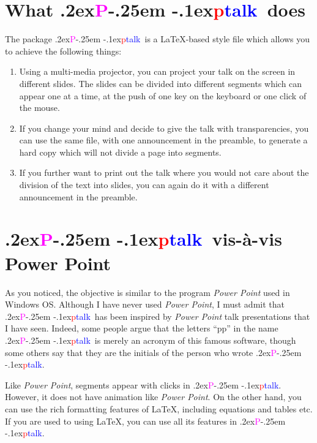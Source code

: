 \documentclass[12pt]{article}
\def\pptalk{{
\raise.2ex\hbox{\textcolor{magenta}P}\kern-.25em
\raise-.1ex\hbox{\textcolor{red}p}\textcolor{blue}{talk}}}
\begin{document}
\section{What \pptalk\ does}
The package \pptalk\ is a \LaTeX-based style file which allows you to
achieve the following things:
%
\begin{enumerate}
\item Using a multi-media projector, you can project your talk on the
screen in different slides.  The slides can be divided into different
segments which can appear one at a time, at the push of one key on the
keyboard or one click of the mouse.


\item If you change your mind and decide to give the talk with
transparencies, you can use the same file, with one announcement in
the preamble, to generate a hard copy which will not divide a page
into segments.

\item If you further want to print out the talk where you would not
care about the division of the text into slides, you can again do it
with a different announcement in the preamble.

\end{enumerate}

\endslide

\beginslide

\section{\pptalk\ vis-\`a-vis Power Point}
%
As you noticed, the objective is similar to the program {\em Power
Point\/} used in Windows OS.  Although I have never used {\em Power
Point\/}, I must admit that \pptalk\ has been inspired by {\em Power
Point\/} talk presentations that I have seen.  Indeed, some people
argue that the letters ``pp'' in the name \pptalk\ is merely an
acronym of this famous software, though some others say that they are
the initials of the person who wrote \pptalk.

Like {\em Power Point\/}, segments appear with clicks in \pptalk.
However, it does not have animation like {\em Power Point\/}.  On the
other hand, you can use the rich formatting features of \LaTeX,
including equations and tables etc.  If you are used to using \LaTeX,
you can use all its features in \pptalk.

\endslide


\beginslide
\end{document}
